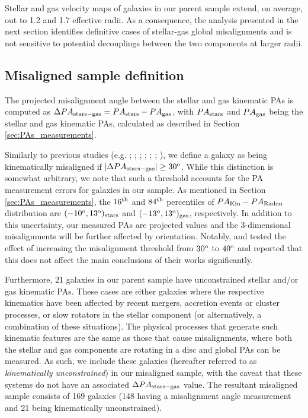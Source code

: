 \documentclass[fleqn,usenatbib]{mnras}
\begin{document}
Stellar and gas velocity maps of galaxies in our parent sample extend, on average, out to 1.2 and 1.7 effective radii. As a consequence, the analysis presented in the next section identifies definitive cases of stellar-gas  global misalignments and is not sensitive to potential decouplings between the two components at larger radii.

\subsection{Misaligned sample definition }
\label{sec:misaligned}

The projected misalignment angle between the stellar and gas kinematic PAs is computed as $\Delta PA_{\rm{stars-gas}} = PA_{\rm{stars}} - PA_{\rm{gas}}$, with $PA_{\rm{stars}}$ and $PA_{\rm{gas}}$ being the stellar and gas kinematic PAs, calculated as described in Section \ref{sec:PAs_measurements}.

Similarly to previous studies (e.g. \citealt{Davis2011}; \citealt{CdpLagos2015}; \citealt{Jin2016}; \citealt{Bryant2019}; \citealt{Casanueva2022}; \citealt{Xu}; \citealt{Zhou2022}), we define a galaxy as being kinematically misaligned if $|\Delta PA_{\rm{stars-gas}}| \geq 30^{\rm{o}}$. While this distinction is somewhat arbitrary, we note that such a threshold accounts for the PA measurement errors for galaxies in our sample. As mentioned in Section \ref{sec:PAs_measurements}, the $16^{\rm{th}}$ and $84^{\rm{th}}$ percentiles of $PA_{\rm{Kin}}-PA_{\rm{Radon}}$ distribution are $(-10^{\rm{o}},13^{\rm{o}})_{\rm{stars}}$ and $(-13^{\rm{o}},13^{\rm{o}})_{\rm{gas}}$, respectively. In addition to this uncertainty, our measured PAs are projected values and the 3-dimensional misalignments will be further affected by orientation. Notably, \cite{Bryant2019} and \cite{Duckworth} tested the effect of increasing the misalignment threshold from $30^{\rm{o}}$ to $40^{\rm{o}}$ and reported that this does not affect the main conclusions of their works significantly.

Furthermore, 21 galaxies in our parent sample have unconstrained stellar and/or gas kinematic PAs. These cases are either galaxies where the respective kinematics have been affected by recent mergers, accretion events or cluster processes, or slow rotators in the stellar component (or alternatively, a combination of these situations). The physical processes that generate such kinematic features are the same as those that cause misalignments, where both the stellar and gas components are rotating in a disc and global PAs can be measured. As such, we include these galaxies (hereafter referred to as \textit{kinematically unconstrained}) in our misaligned sample, with the caveat that these systems do not have an associated $\Delta PA_{\rm{stars-gas}}$ value. The resultant misaligned sample consists of 169 galaxies (148 having a misalignment angle measurement and 21 being kinematically unconstrained). 
\end{document}
